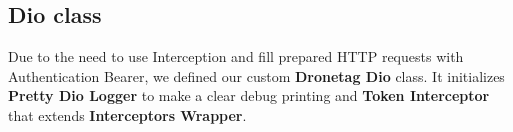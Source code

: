 \subsection{Dio class}\label{subsec:dio-class}
Due to the need to use Interception and fill prepared HTTP requests with Authentication Bearer, we defined our custom \textbf{Dronetag Dio} class.
It initializes \textbf{Pretty Dio Logger} to make a clear debug printing and \textbf{Token Interceptor} that extends \textbf{Interceptors Wrapper}.
